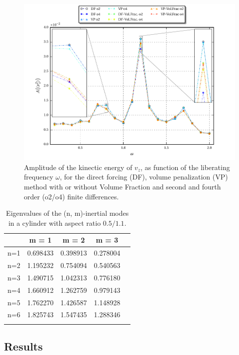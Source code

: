\clearpage

\begin{figure}[!t]
  \centering
  \includegraphics{gfx/cone/cylinder/cylinder.pdf}  \caption{\label{fig:cone:cyl}
    Amplitude of the kinectic energy of $v_z$, as function of the liberating frequency $\omega$,
   for the direct forcing (DF), volume penalization (VP) method with or without Volume Fraction and
      second and fourth order (o2/o4) finite differences.}
\end{figure}

\bgroup\large
\begin{table}[!b]
\centering
\def\arraystretch{1.5}%
\begin{tabular}{c c c c c}\toprule
            &    m =  1  & m = 2   & m = 3 \\ \hline
\midrule
        n=1 &   0.698433 &0.398913 &0.278004\\
        n=2 &   1.195232 &0.754094 &0.540563\\
        n=3 &   1.490715 &1.042313 &0.776180\\
        n=4 &   1.660912 &1.262759 &0.979143\\
        n=5 &   1.762270 &1.426587 &1.148928\\
        n=6 &   1.825743 &1.547435 &1.288346\\ \hline
\bottomrule
\label{cone_cyleigenvalues}
\end{tabular}
\caption{Eigenvalues of the (n, m)-inertial modes in  a cylinder with aspect ratio $0.5/1.1$.}
\end{table}
\egroup
\clearpage

\subsection{Results}
